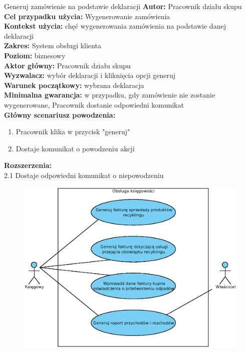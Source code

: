 \begin{usecase}{Generuj zamówienie na podstawie deklaracji}
	\textbf{Autor:} Pracownik działu skupu\\
	\textbf{Cel przypadku użycia:} Wygenerowanie zamówienia \\
	\textbf{Kontekst użycia:} chęć wygenerowania zamówienia na podstawie danej deklaracji\\
	\textbf{Zakres:} System obsługi klienta \\
	\textbf{Poziom:} biznesowy \\
	\textbf{Aktor główny:} Pracownik działu skupu\\
	\textbf{Wyzwalacz:} wybór deklaracji i kliknięcia opcji generuj \\
	\textbf{Warunek początkowy:} wybrana deklaracja \\
	\textbf{Minimalna gwarancja:} w przypadku, gdy zamówienie nie zostanie wygenerowane, Pracownik dostanie odpowiedni komunikat \\
	\textbf{Główny scenariusz powodzenia:} \\
		\begin{enumerate}
			\item Pracownik klika w przycisk "generuj"
			\item Dostaje komunikat o powodzeniu akcji
		\end{enumerate}
	\textbf{Rozszerzenia:} \\
			2.1 Dostaje odpowiedni komunikat o niepowodzeniu
\end{usecase}

\begin{figure}[H]
	\centering
	\includegraphics[width=.8\textwidth]{img/UC/ksiegowosc.eps}
\end{figure}

